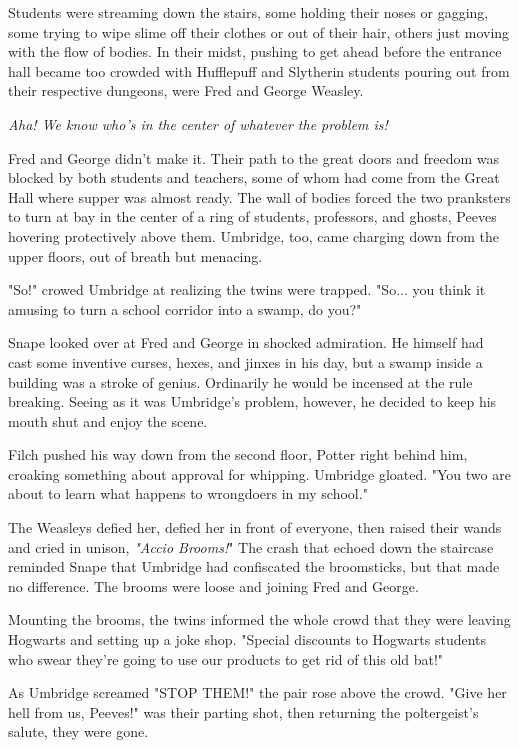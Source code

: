 Students were streaming down the stairs, some holding their noses or gagging, some trying to wipe slime off their clothes or out of their hair, others just moving with the flow of bodies. In their midst, pushing to get ahead before the entrance hall became too crowded with Hufflepuff and Slytherin students pouring out from their respective dungeons, were Fred and George Weasley.

\emph{Aha! We know who's in the center of whatever the problem is!}

Fred and George didn't make it. Their path to the great doors and freedom was blocked by both students and teachers, some of whom had come from the Great Hall where supper was almost ready. The wall of bodies forced the two pranksters to turn at bay in the center of a ring of students, professors, and ghosts, Peeves hovering protectively above them. Umbridge, too, came charging down from the upper floors, out of breath but menacing.

"So!" crowed Umbridge at realizing the twins were trapped. "So... you think it amusing to turn a school corridor into a swamp, do you?"

Snape looked over at Fred and George in shocked admiration. He himself had cast some inventive curses, hexes, and jinxes in his day, but a swamp inside a building was a stroke of genius. Ordinarily he would be incensed at the rule breaking. Seeing as it was Umbridge's problem, however, he decided to keep his mouth shut and enjoy the scene.

Filch pushed his way down from the second floor, Potter right behind him, croaking something about approval for whipping. Umbridge gloated. "You two are about to learn what happens to wrongdoers in my school."

The Weasleys defied her, defied her in front of everyone, then raised their wands and cried in unison, \emph{"Accio Brooms!}" The crash that echoed down the staircase reminded Snape that Umbridge had confiscated the broomsticks, but that made no difference. The brooms were loose and joining Fred and George.

Mounting the brooms, the twins informed the whole crowd that they were leaving Hogwarts and setting up a joke shop. "Special discounts to Hogwarts students who swear they're going to use our products to get rid of this old bat!"

As Umbridge screamed "STOP THEM!" the pair rose above the crowd. "Give her hell from us, Peeves!" was their parting shot, then returning the poltergeist's salute, they were gone.

